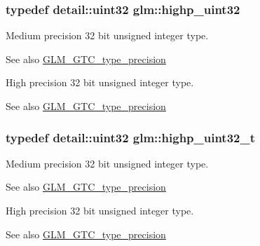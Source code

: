 \subsubsection[{\texorpdfstring{highp\+\_\+uint32}{highp_uint32}}]{\setlength{\rightskip}{0pt plus 5cm}typedef detail\+::uint32 {\bf glm\+::highp\+\_\+uint32}}\hypertarget{group__gtc__type__precision_ga3145e44c73e2df7dfe4f3cb65974bf22}{}\label{group__gtc__type__precision_ga3145e44c73e2df7dfe4f3cb65974bf22}
Medium precision 32 bit unsigned integer type. \begin{DoxySeeAlso}{See also}
\hyperlink{group__gtc__type__precision}{G\+L\+M\+\_\+\+G\+T\+C\+\_\+type\+\_\+precision}
\end{DoxySeeAlso}
High precision 32 bit unsigned integer type. \begin{DoxySeeAlso}{See also}
\hyperlink{group__gtc__type__precision}{G\+L\+M\+\_\+\+G\+T\+C\+\_\+type\+\_\+precision} 
\end{DoxySeeAlso}
\subsubsection[{\texorpdfstring{highp\+\_\+uint32\+\_\+t}{highp_uint32_t}}]{\setlength{\rightskip}{0pt plus 5cm}typedef detail\+::uint32 {\bf glm\+::highp\+\_\+uint32\+\_\+t}}\hypertarget{group__gtc__type__precision_ga8eb85ad460079c63b68866ae34637bda}{}\label{group__gtc__type__precision_ga8eb85ad460079c63b68866ae34637bda}
Medium precision 32 bit unsigned integer type. \begin{DoxySeeAlso}{See also}
\hyperlink{group__gtc__type__precision}{G\+L\+M\+\_\+\+G\+T\+C\+\_\+type\+\_\+precision}
\end{DoxySeeAlso}
High precision 32 bit unsigned integer type. \begin{DoxySeeAlso}{See also}
\hyperlink{group__gtc__type__precision}{G\+L\+M\+\_\+\+G\+T\+C\+\_\+type\+\_\+precision} 
\end{DoxySeeAlso}

